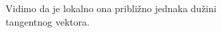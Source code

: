 \documentclass[preview]{standalone}
\begin{document}
\begin{center}
Vidimo da je lokalno ona približno jednaka dužini\\ tangentnog vektora.
\end{center}
\end{document}

